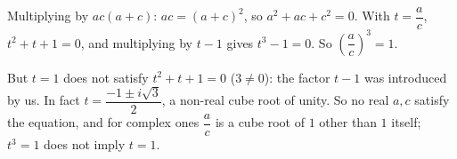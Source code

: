 Multiplying by $ac(a+c)$: $ac=(a+c)^2$, so $a^2+ac+c^2=0$. With $t=\dfrac ac$, $t^2+t+1=0$, and multiplying by $t-1$ gives $t^3-1=0$. So $\left(\dfrac ac\right)^3=\boxed{1}$.

But $t=1$ does not satisfy $t^2+t+1=0$ ($3\ne0$): the factor $t-1$ was introduced by us. In fact $t=\dfrac{-1\pm i\sqrt3}{2}$, a non-real cube root of unity. So no real $a,c$ satisfy the equation, and for complex ones $\dfrac ac$ is a cube root of $1$ other than $1$ itself; $t^3=1$ does not imply $t=1$.
